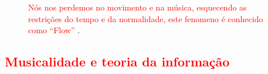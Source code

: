 \begin{figure}[t]
\begin{elaboracion}[title=Que é o ``flow''?]
\label{page:flow}
\textcolor{red}{Nós nos perdemos no movimento e na música,
esquecendo as restrições do tempo e da normalidade, este fenomeno é conhecido como ``Flow''} \cite{czikszentmihalyi1990flow} \cite{trehub2003developmental}.
\end{elaboracion}
\label{fig:flow}
\end{figure}

\subsection{\textcolor{red}{Musicalidade e teoria da informação}}
